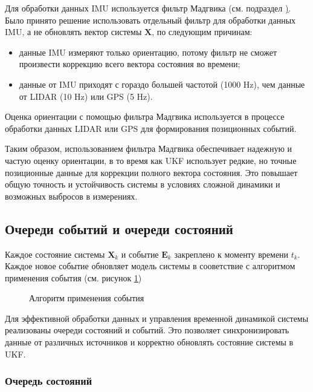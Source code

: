 Для обработки данных IMU используется фильтр Мадгвика (см. подраздел \href{sec:ahrs}). Было принято решение использовать
отдельный фильтр для обработки данных IMU, а не обновлять вектор системы $\mathbf{X}$,
по следующим причинам:
\begin{itemize}
	\item данные IMU измеряют только ориентацию, потому фильтр не сможет произвести коррекцию
	      всего вектора состояния во времени;
        \item данные от IMU приходят с гораздо большей частотой (1000 Hz), чем данные от LIDAR (10 Hz) или GPS (5 Hz).
\end{itemize}

Оценка ориентации с помощью фильтра Мадгвика используется 
в процессе обработки данных LIDAR или GPS для формирования позиционных событий.

Таким образом, использованием фильтра Мадгвика обеспечивает надежную и частую оценку ориентации, в то время как UKF использует редкие, но точные позиционные данные для коррекции полного вектора состояния.
Это повышает общую точность и устойчивость системы в условиях сложной динамики и возможных выбросов в измерениях.

\subsection{Очереди событий и очереди состояний}
\label{subsec:queues}

Каждое состояние системы $\mathbf{X}_k$ и событие $\mathbf{E}_k$ 
закреплено к моменту времени $t_k$. Каждое новое событие 
обновляет модель системы в сооветствие с алгоритмом применения события (см. рисунок \ref{fig:apply_kf_event})
\FloatBarrier
\begin{figure}[H]
\centering
\caption{Алгоритм применения события}
\label{fig:apply_kf_event}
\end{figure}

Для эффективной обработки данных и управления временной динамикой системы реализованы очереди состояний и событий.
Это позволяет синхронизировать данные от различных источников и корректно обновлять состояние системы в UKF.

\subsubsection{Очередь состояний}
\label{subsec:state_queue}
\hfill

